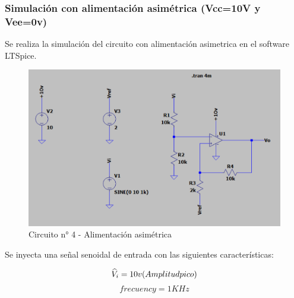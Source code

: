 \subsubsection{Simulación con alimentación asimétrica (Vcc=10V y Vee=0v)}

Se realiza la simulación del circuito con alimentación asimetrica en el software LTSpice.

\begin{figure}[h!]
    \centering
    \includegraphics[width=1.0\linewidth]{Secciones/Circuito4/Circuito 4 - Alimentación asimétrica.png}
    \caption{Circuito n° 4 - Alimentación asimétrica}
    \label{fig:AlimentacionAsimetrica}
\end{figure}

Se inyecta una señal senoidal de entrada con las siguientes características:

\[{\widehat{V}}_i= 10v \space (Amplitud \space pico)\]
\[frecuency= 1KHz\]

